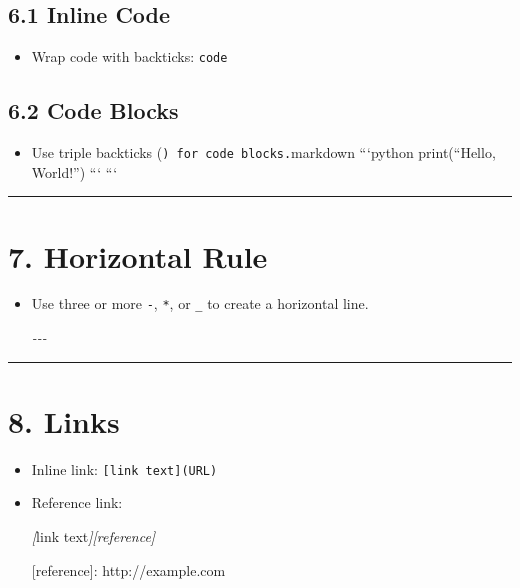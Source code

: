 \documentclass[
]{book}
\newenvironment{Shaded}{\begin{snugshade}}{\end{snugshade}}
\newcommand{\CommentTok}[1]{\textcolor[rgb]{0.56,0.35,0.01}{\textit{#1}}}
\newcommand{\OtherTok}[1]{\textcolor[rgb]{0.56,0.35,0.01}{#1}}
\providecommand{\tightlist}{%
  \setlength{\itemsep}{0pt}\setlength{\parskip}{0pt}}
\theoremstyle{definition}
\theoremstyle{definition}
\theoremstyle{definition}
\theoremstyle{definition}
\theoremstyle{remark}
\begin{document}
\subsection{6.1 Inline Code}\label{inline-code}

\begin{itemize}
\tightlist
\item
  Wrap code with backticks: \texttt{\textasciigrave{}code\textasciigrave{}}
\end{itemize}

\subsection{6.2 Code Blocks}\label{code-blocks}

\begin{itemize}
\tightlist
\item
  Use triple backticks (\texttt{)\ for\ code\ blocks.}markdown
  ```python
  print(``Hello, World!'')
  ```
  ```
\end{itemize}

\begin{center}\rule{0.5\linewidth}{0.5pt}\end{center}

\section{7. Horizontal Rule}\label{horizontal-rule}

\begin{itemize}
\item
  Use three or more \texttt{-}, \texttt{*}, or \texttt{\_} to create a horizontal line.

\begin{Shaded}
\begin{Highlighting}[]
\CommentTok{{-}{-}{-}}
\end{Highlighting}
\end{Shaded}
\end{itemize}

\begin{center}\rule{0.5\linewidth}{0.5pt}\end{center}

\section{8. Links}\label{links}

\begin{itemize}
\item
  Inline link: \texttt{{[}link\ text{]}(URL)}
\item
  Reference link:

\begin{Shaded}
\begin{Highlighting}[]
\CommentTok{[}\OtherTok{link text}\CommentTok{][reference]}

\OtherTok{[reference]: http://example.com}
\end{Highlighting}
\end{Shaded}
\end{itemize}
\end{document}

